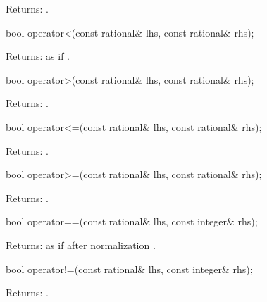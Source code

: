 \begin{itemdescr}
Returns: .
\end{itemdescr}

\begin{itemdecl}
bool operator<(const rational& lhs, const rational& rhs);
\end{itemdecl}

\begin{itemdescr}
Returns: as if .
\end{itemdescr}

\begin{itemdecl}
bool operator>(const rational& lhs, const rational& rhs);
\end{itemdecl}

\begin{itemdescr}
Returns: .
\end{itemdescr}

\begin{itemdecl}
bool operator<=(const rational& lhs, const rational& rhs);
\end{itemdecl}

\begin{itemdescr}
Returns: .
\end{itemdescr}

\begin{itemdecl}
bool operator>=(const rational& lhs, const rational& rhs);
\end{itemdecl}

\begin{itemdescr}
Returns: .
\end{itemdescr}

\begin{itemdecl}
bool operator==(const rational& lhs, const integer& rhs);
\end{itemdecl}

\begin{itemdescr}
Returns: as if after normalization .
\end{itemdescr}

\begin{itemdecl}
bool operator!=(const rational& lhs, const integer& rhs);
\end{itemdecl}

\begin{itemdescr}
Returns: .
\end{itemdescr}

